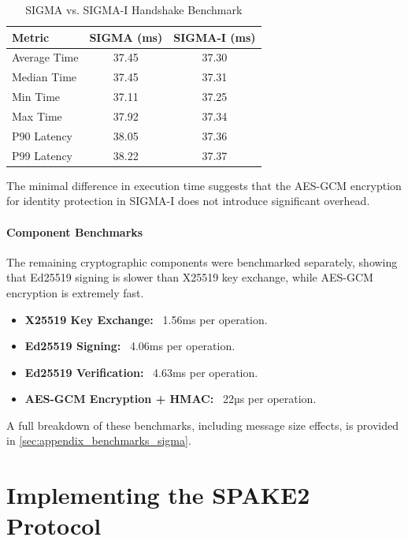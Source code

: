 \documentclass[twoside,a4paper,12pt]{article}
\begin{document}
\begin{table}[h]
    \centering
    \label{tab:sigma_benchmark}
    \renewcommand{\arraystretch}{1.2} %
    \begin{tabular}{lcc}
        \toprule
        \textbf{Metric} & \textbf{SIGMA (ms)} & \textbf{SIGMA-I (ms)} \\
        \midrule
        Average Time & 37.45 & 37.30 \\
        Median Time & 37.45 & 37.31 \\
        Min Time & 37.11 & 37.25 \\
        Max Time & 37.92 & 37.34 \\
        P90 Latency & 38.05 & 37.36 \\
        P99 Latency & 38.22 & 37.37 \\
        \bottomrule
    \end{tabular}
    \caption{SIGMA vs. SIGMA-I Handshake Benchmark}
\end{table}

The minimal difference in execution time suggests that the AES-GCM encryption for identity protection in SIGMA-I does not introduce significant overhead.

\paragraph{Component Benchmarks}
The remaining cryptographic components were benchmarked separately, showing that Ed25519 signing is slower than X25519 key exchange, while AES-GCM encryption is extremely fast.

\begin{itemize}
    \item \textbf{X25519 Key Exchange:} ~1.56ms per operation.
    \item \textbf{Ed25519 Signing:} ~4.06ms per operation.
    \item \textbf{Ed25519 Verification:} ~4.63ms per operation.
    \item \textbf{AES-GCM Encryption + HMAC:} ~22µs per operation.
\end{itemize}

A full breakdown of these benchmarks, including message size effects, is provided in \autoref{sec:appendix_benchmarks_sigma}.

\section{Implementing the SPAKE2 Protocol}
\label{sec:spake2}
\end{document}
